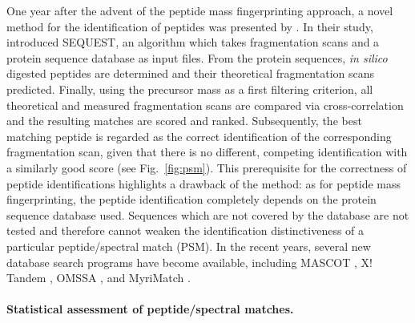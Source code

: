 One year after the advent of the peptide mass fingerprinting approach, a novel
method for the identification of peptides was presented by \citet{Eng1994}.
In their study, \citeauthor{Eng1994} introduced SEQUEST, an algorithm which
takes fragmentation scans and a protein sequence database as input files.
From the protein sequences, {\em in silico} digested peptides are determined
and their theoretical fragmentation scans predicted.
Finally, using the precursor mass as a first filtering criterion, all
theoretical and measured fragmentation scans are compared via cross-correlation
and the resulting matches are scored and ranked.
Subsequently, the best matching peptide is regarded as the correct 
identification of the corresponding fragmentation scan, given that there is
no different, competing identification with a similarly good score (see 
Fig.~\ref{fig:psm}).
This prerequisite for the correctness of peptide identifications highlights
a drawback of the method: as for peptide mass fingerprinting, the peptide
identification completely depends on the protein sequence database used.
Sequences which are not covered by the database are not tested and therefore
cannot weaken the identification distinctiveness of a particular 
peptide/spectral match (PSM).
In the recent years, several new database search programs have become 
available, including MASCOT \citep{Perkins1999}, X! Tandem \citep{Craig2004},
OMSSA \citep{Geer2004}, and MyriMatch \citep{Tabb2007}.

\paragraph{Statistical assessment of peptide/spectral matches.} 

